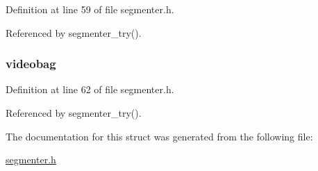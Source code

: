 \-Definition at line 59 of file segmenter.\-h.



\-Referenced by segmenter\-\_\-try().

\hypertarget{struct_transcoder_data_aceb5b4e8609bbec3bf57e52a7f4d865a}{
\subsubsection[{videobag}]{ {\bf videobag}}}\label{struct_transcoder_data_aceb5b4e8609bbec3bf57e52a7f4d865a}


\-Definition at line 62 of file segmenter.\-h.



\-Referenced by segmenter\-\_\-try().



\-The documentation for this struct was generated from the following file\-:\begin{DoxyCompactItemize}
\item 
\hyperlink{segmenter_8h}{segmenter.\-h}\end{DoxyCompactItemize}
